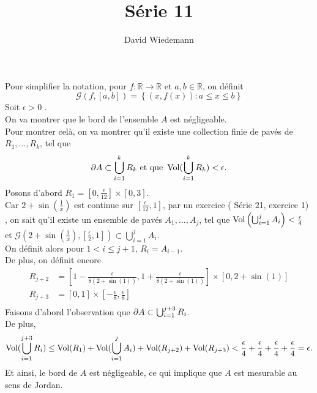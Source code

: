 \documentclass[11pt, a4paper]{article}
\begin{document}
\title{Série 11}
\author{David Wiedemann}
\maketitle
Pour simplifier la notation, pour $f: \mathbb{R}\to \mathbb{R}$ et $a,b \in \mathbb{R}$, on définit
\[ 
	\mathcal{G}( f, [ a,b] ) = \left\{ ( x, f( x) ) : a \leq x \leq b  \right\} 
\]
\hr
Soit $\epsilon>0$ .\\
On va montrer que le bord de l'ensemble $A$ est négligeable.\\
Pour montrer celà, on va montrer qu'il existe une collection finie de pavés de $R_1, \ldots, R_k$, tel que
\[ 
\partial A \subset \bigcup_{i=1}^{k} R_k \text{ et que } \operatorname*{Vol} (  \bigcup_{i=1} ^{k}R_k ) < \epsilon.
\]
Posons d'abord $R_1 = [ 0, \frac{\epsilon}{12}] \times [ 0,3] $.\\
Car $2 + \sin ( \frac{1}{x} )$ est continue sur $[\frac{\epsilon}{12}, 1]$, par un exercice ( Série 21, exercice 1) , on sait qu'il existe un ensemble de pavés $A_1, \ldots , A_j$, tel que $\operatorname*{Vol} \left(   \bigcup_{i=1} ^{j}A_i \right) < \frac{\epsilon}{4}$ et $ \mathcal{G}\left( 2 + \sin ( \frac{1}{x}) , [ \frac{\epsilon}{2}, 1] \right) \subset \bigcup_{i=1} ^{j}A_i $.\\
On définit alors pour  $1< i \leq j+1$, $R_i = A_{i-1} $.\\
De plus, on définit encore
\begin{align*}
	R_{j+2} &= \left[ 1- \frac{\epsilon}{8( 2 + \sin ( 1) )}, 1+ \frac{\epsilon}{8 ( 2 + \sin ( 1) ) }\right] \times [ 0, 2 + \sin ( 1) ] \\
	R_{j+3} &= [ 0, 1] \times [ - \frac{\epsilon}{8}, \frac{\epsilon}{8}]\\
\end{align*}
Faisons d'abord l'observation que $\partial A \subset \bigcup_{i=1} ^{j+3}R_i$.\\
De plus, 
\[ 
	\operatorname*{Vol} ( \bigcup_{i=1} ^{j+3} R_i) \leq \operatorname*{Vol} ( R_1) + \operatorname*{Vol} ( \bigcup_{i=1} ^{j}A_i) + \operatorname*{Vol} ( R_{j+2} ) + \operatorname*{Vol} ( R_{j+3} ) < \frac{\epsilon}{4} +  \frac{\epsilon}{4} +  \frac{\epsilon}{4} +  \frac{\epsilon}{4} =\epsilon.
\]
Et ainsi, le bord de $A$ est négligeable, ce qui implique que $A$ est mesurable au sens de Jordan.
	
\end{document}
